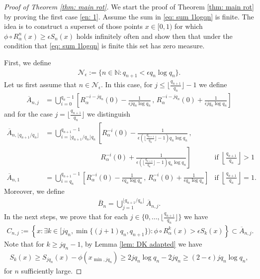 \documentclass[11pt]{amsart}
\theoremstyle{definition}
\numberwithin{equation}{section}
\begin{document}
\begin{proof}[Proof of Theorem \ref{thm: main rot}]
We start the proof of Theorem \ref{thm: main rot} by proving the first case \eqref{en: 1}. Assume the sum in \eqref{eq: sum 1logqn} is finite. 
The idea is to construct a superset of those points $x\in [0,1)$ for which $\phi\circ R_{\alpha}^n(x)\geq \epsilon S_n(x)$ holds infinitely often and show then that under the condition that \eqref{eq: sum 1logqn} is finite this set has zero measure. 




First, we define 
\begin{align*}
 \mathcal{N}_{\epsilon}:=\{n\in\mathbb{N}: q_{n+1}< \epsilon q_n\log q_n\}.
\end{align*}
Let us first assume that $n\in \mathcal{N}_{\epsilon}$.
In this case, for $j\leq \lfloor \frac{q_{n+1}}{q_n}\rfloor-1$ we define
 \begin{align*}
  \overline{A}_{n,j}
  &=\bigcup_{i=0}^{q_{n}-1} 
  \left[ R_{\alpha}^{-i-jq_n}(0)-\frac{1}{\epsilon j q_n\log q_n}\, ,\, R_{\alpha}^{-i-jq_n}(0) + \frac{1}{\epsilon j q_n\log q_n}\right]
 \end{align*}
 and for the case $j=\lfloor \frac{q_{n+1}}{q_n}\rfloor$ we distinguish
 \begin{align*}
  \overline{A}_{n,\lfloor q_{n+1}/q_n\rfloor}
  &=\bigcup_{i=\lfloor q_{n+1}/q_n\rfloor q_n}^{q_{n+1}-1} 
  \left[ R_{\alpha}^{-i}(0)-\frac{1}{\epsilon (\lfloor \frac{q_{n+1}}{q_n}\rfloor-1) q_n\log q_n}\,,\right.\\
  &\qquad\qquad\qquad\qquad\left. R_{\alpha}^{-i}(0) + \frac{1}{\epsilon (\lfloor \frac{q_{n+1}}{q_n}\rfloor-1) q_n\log q_n}\right] &\text{if } \left\lfloor \frac{q_{n+1}}{q_n}\right\rfloor>1\\
  \overline{A}_{n,1}
  &=\bigcup_{i= q_n}^{q_{n+1}-1} 
  \left[ R_{\alpha}^{-i}(0)-\frac{1}{\epsilon  q_n\log q_n}\,,\, R_{\alpha}^{-i}(0) + \frac{1}{\epsilon q_n\log q_n}\right] &\text{if }\left\lfloor \frac{q_{n+1}}{q_n}\right\rfloor=1.
  \end{align*}
Moreover, we define 
\begin{align}
 \overline{B}_n= \bigcup_{j=1}^{\lfloor q_{n+1}/q_n\rfloor } \overline{A}_{n,j}.\label{eq: def sup B}
\end{align}
In the next steps, we prove that for each $j\in\{0,\ldots, \lfloor \frac{q_{n+1}}{q_n}\rfloor \}$ we have 
 \begin{align}
  C_{n,j}:=\left\{x: \exists k\in  [j q_n,\min \{(j+1)q_n, q_{n+1}\}): \phi\circ R_{\alpha}^k(x)> \epsilon S_{k}(x) \right\} \subset \overline{A}_{n,j}.\label{eq: Cnj subset Anj}
 \end{align}
Note that for $k\geq jq_n-1$, by Lemma \ref{lem: DK adapted} we have 
 \begin{align*}
  S_k(x)\geq  S_{jq_n}(x)-\phi(x_{\min,jq_n})\geq  2jq_n\log q_n-2jq_n\geq  (2-\epsilon) jq_n\log q_n, 
 \end{align*}
for $n$ sufficiently large.



\end{proof}
\end{document}
